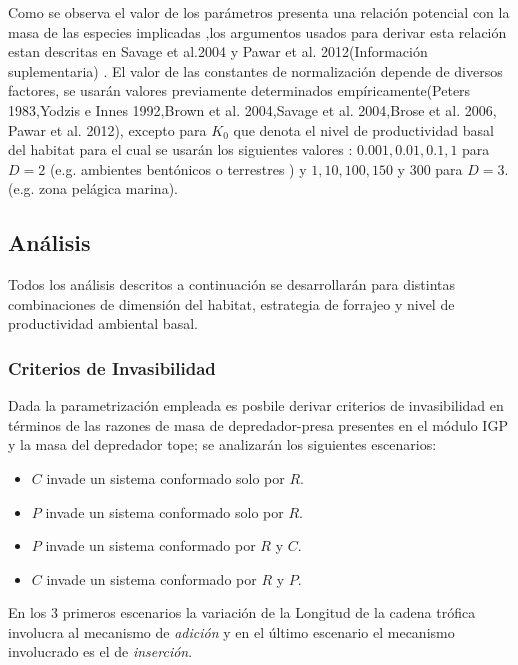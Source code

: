 \documentclass[a4paper,12pt]{article}
\begin{document}
Como se observa el valor de los par\'ametros presenta una relaci\'on potencial con la masa de las especies implicadas ,los argumentos usados para derivar esta relaci\'on estan descritas en Savage et al.2004 y Pawar et al. 2012(Informaci\'on suplementaria) . El valor de las constantes de normalizaci\'on depende de diversos factores, se usar\'an valores previamente determinados emp\'iricamente(Peters 1983,Yodzis e Innes 1992,Brown et al. 2004,Savage et al. 2004,Brose et al. 2006, Pawar et al. 2012), excepto para $K_0$ que denota el nivel de productividad basal del habitat para el cual se usar\'an los siguientes valores : $0.001,0.01,0.1,1$ para $D =2 $ (e.g. ambientes bent\'onicos o terrestres ) y $1,10,100,150$ y $300$ para $D=3$.(e.g. zona pel\'agica marina).

\subsection{An\'alisis}
Todos los an\'alisis descritos a continuaci\'on se desarrollar\'an para distintas combinaciones de dimensi\'on del habitat, estrategia de forrajeo y nivel de productividad ambiental basal.
\subsubsection{Criterios de Invasibilidad}
Dada la parametrizaci\'on empleada es posbile derivar criterios de invasibilidad en t\'erminos de las razones de masa de depredador-presa presentes en el m\'odulo IGP y la masa del depredador tope; se analizar\'an los siguientes escenarios:
\begin{itemize}
\item $C$ invade un sistema conformado solo por $R$.
\item $P$ invade un sistema conformado solo por $R$.
\item $P$ invade un sistema conformado por $R$ y $C$.
\item $C$ invade un sistema conformado por $R$ y $P$.
\end{itemize}
En los 3 primeros escenarios la variaci\'on de la Longitud de la cadena tr\'ofica involucra al mecanismo de \textit{adici\'on} y en el \'ultimo escenario el mecanismo involucrado es el de \textit{inserci\'on}.
\end{document}
